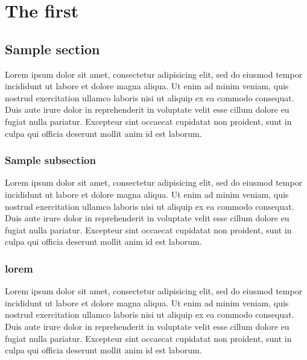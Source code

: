 
\chapter{The first}
\section{Sample section}

Lorem ipsum dolor sit amet, consectetur adipisicing elit, sed do eiusmod
tempor incididunt ut labore et dolore magna aliqua. Ut enim ad minim veniam,
quis nostrud exercitation ullamco laboris nisi ut aliquip ex ea commodo
consequat. Duis aute irure dolor in reprehenderit in voluptate velit esse
cillum dolore eu fugiat nulla pariatur. Excepteur sint occaecat cupidatat non
proident, sunt in culpa qui officia deserunt mollit anim id est laborum.


\subsection{Sample subsection}

Lorem ipsum dolor sit amet, consectetur adipisicing elit, sed do eiusmod
tempor incididunt ut labore et dolore magna aliqua. Ut enim ad minim veniam,
quis nostrud exercitation ullamco laboris nisi ut aliquip ex ea commodo
consequat. Duis aute irure dolor in reprehenderit in voluptate velit esse
cillum dolore eu fugiat nulla pariatur. Excepteur sint occaecat cupidatat non
proident, sunt in culpa qui officia deserunt mollit anim id est laborum.

\subsection{lorem}

Lorem ipsum dolor sit amet, consectetur adipisicing elit, sed do eiusmod
tempor incididunt ut labore et dolore magna aliqua. Ut enim ad minim veniam,
quis nostrud exercitation ullamco laboris nisi ut aliquip ex ea commodo
consequat. Duis aute irure dolor in reprehenderit in voluptate velit esse
cillum dolore eu fugiat nulla pariatur. Excepteur sint occaecat cupidatat non
proident, sunt in culpa qui officia deserunt mollit anim id est laborum.

